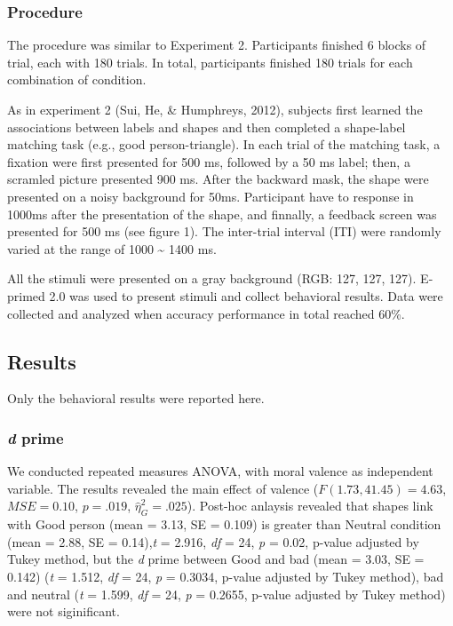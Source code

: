 \documentclass[man]{apa6}
\begin{document}
\hypertarget{procedure-9}{%
\subsubsection{Procedure}\label{procedure-9}}

The procedure was similar to Experiment 2. Participants finished 6 blocks of trial, each with 180 trials. In total, participants finished 180 trials for each combination of condition.

As in experiment 2 (Sui, He, \& Humphreys, 2012), subjects first learned the associations between labels and shapes and then completed a shape-label matching task (e.g., good person-triangle). In each trial of the matching task, a fixation were first presented for 500 ms, followed by a 50 ms label; then, a scramled picture presented 900 ms. After the backward mask, the shape were presented on a noisy background for 50ms. Participant have to response in 1000ms after the presentation of the shape, and finnally, a feedback screen was presented for 500 ms (see figure 1). The inter-trial interval (ITI) were randomly varied at the range of 1000 \textasciitilde{} 1400 ms.

All the stimuli were presented on a gray background (RGB: 127, 127, 127). E-primed 2.0 was used to present stimuli and collect behavioral results. Data were collected and analyzed when accuracy performance in total reached 60\%.

\hypertarget{results-9}{%
\subsection{Results}\label{results-9}}

Only the behavioral results were reported here.

\hypertarget{d-prime-2}{%
\subsubsection{\texorpdfstring{\emph{d} prime}{d prime}}\label{d-prime-2}}

We conducted repeated measures ANOVA, with moral valence as independent variable. The results revealed the main effect of valence (\(F(1.73, 41.45) = 4.63\), \(\mathit{MSE} = 0.10\), \(p = .019\), \(\hat{\eta}^2_G = .025\)). Post-hoc anlaysis revealed that shapes link with Good person (mean = 3.13, SE = 0.109) is greater than Neutral condition (mean = 2.88, SE = 0.14),\emph{t} = 2.916, \emph{df} = 24, \emph{p} = 0.02, p-value adjusted by Tukey method, but the \emph{d} prime between Good and bad (mean = 3.03, SE = 0.142) (\emph{t} = 1.512, \emph{df} = 24, \emph{p} = 0.3034, p-value adjusted by Tukey method), bad and neutral (\emph{t} = 1.599, \emph{df} = 24, \emph{p} = 0.2655, p-value adjusted by Tukey method) were not siginificant.
\end{document}
